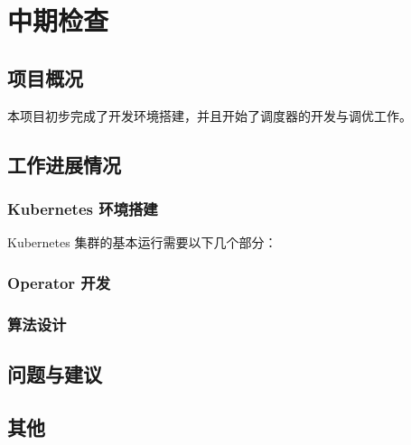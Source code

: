 \cleardoublepage
\chapter{中期检查}

\section{项目概况}

本项目初步完成了开发环境搭建，并且开始了调度器的开发与调优工作。

\section{工作进展情况}

\subsection{Kubernetes 环境搭建}

Kubernetes 集群的基本运行需要以下几个部分：

\subsection{Operator 开发}

\subsection{算法设计}

\section{问题与建议}

\section{其他}
